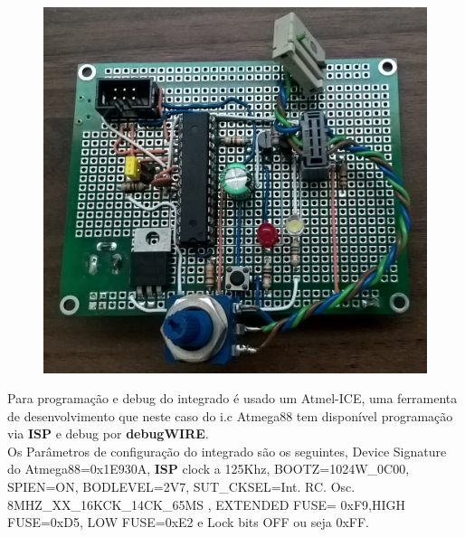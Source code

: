 \documentclass[titlepage, a4paper, 10pt, reqno, openany]{report}
\begin{document}
\begin{figure}[H]
	\centering
	\includegraphics[scale=0.085]{./image/Board/DevBoard_1.JPG}
\end{figure}
Para programa\c{c}\~{a}o e debug do integrado \'{e} usado um Atmel-ICE, uma ferramenta de desenvolvimento que neste caso do i.c Atmega88 tem dispon\'{i}vel programa\c{c}\~{a}o via {\bf ISP} e debug por {\bf debugWIRE}. \\
Os Par\^{a}metros de configura\c{c}\~{a}o do integrado s\~{a}o os seguintes, Device Signature do Atmega88=0x1E930A, {\bf ISP} clock a 125Khz, BOOTZ=1024W\_0C00, SPIEN=ON, BODLEVEL=2V7, SUT\_CKSEL=Int. RC. Osc. 8MHZ\_XX\_16KCK\_14CK\_65MS , EXTENDED FUSE= 0xF9,HIGH FUSE=0xD5, LOW FUSE=0xE2 e Lock bits OFF ou seja 0xFF.\\
\end{document}

